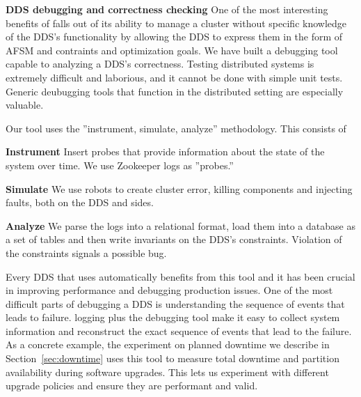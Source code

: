 \textbf{DDS debugging and correctness checking}
%
One of the most interesting benefits of \helix falls out of its ability to
manage a cluster without specific knowledge of the DDS's
functionality by allowing the DDS
to express them in the form of AFSM and contraints and optimization goals. We
have built a debugging tool capable to analyzing a DDS's correctness.
Testing distributed systems is extremely difficult and laborious, and it cannot
be done with simple unit tests.   Generic
deubugging tools that function in the distributed setting are especially valuable.  

Our tool uses the ''instrument,
simulate, analyze'' methodology. This consists of
\squishlist
\item \textbf{Instrument} Insert probes that provide information about the state of the system
over time.  We use Zookeeper logs as ''probes.''
\item \textbf{Simulate} We use robots to create cluster error, killing
components and injecting faults, both on the DDS and \helix sides.
\item \textbf{Analyze} We parse the logs into a relational format, load them into a database as
a set of tables and then write invariants on the DDS's constraints.  Violation
of the constraints signals a possible bug.
\squishend

Every DDS that uses \helix automatically benefits from this tool and it has been crucial
in improving performance and debugging production issues.  
One of the most difficult parts of debugging a DDS is understanding the sequence
of events that leads to failure.  \helix logging plus the debugging tool make it
easy to collect system information and reconstruct the exact sequence of
events that lead to the failure.
As a concrete example, the experiment on
planned downtime we describe in Section~\ref{sec:downtime} uses this tool to
measure total downtime and partition availability during software upgrades.
This lets us experiment with different upgrade policies and ensure they are
performant and valid.


